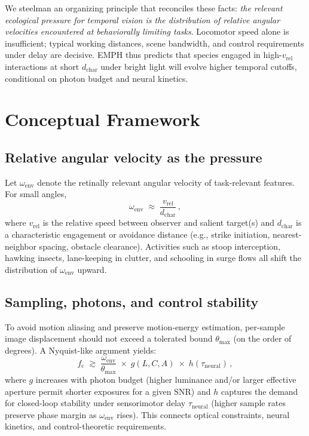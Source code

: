 \documentclass[11pt]{article}
\newcommand{\fc}{f_{\mathrm{c}}}             %
\newcommand{\vrel}{v_{\mathrm{rel}}}          %
\newcommand{\dchar}{d_{\mathrm{char}}}        %
\newcommand{\thetamax}{\theta_{\max}}         %
\newcommand{\taus}{\tau_{\mathrm{neural}}}    %
\newcommand{\Lumin}{L}                        %
\newcommand{\Contrast}{C}                     %
\newcommand{\Aperture}{A}                     %
\begin{document}
We steelman an organizing principle that reconciles these facts: \emph{the relevant ecological pressure for temporal vision is the distribution of relative angular velocities encountered at behaviorally limiting tasks}. Locomotor speed alone is insufficient; typical working distances, scene bandwidth, and control requirements under delay are decisive. EMPH thus predicts that species engaged in high-$\vrel$ interactions at short $\dchar$ under bright light will evolve higher temporal cutoffs, conditional on photon budget and neural kinetics.

\section{Conceptual Framework}
\subsection{Relative angular velocity as the pressure}
Let $\omega_{\text{env}}$ denote the retinally relevant angular velocity of task-relevant features. For small angles,
\begin{equation}
\omega_{\text{env}}\;\approx\;\frac{\vrel}{\dchar}\,,
\end{equation}
where $\vrel$ is the relative speed between observer and salient target(s) and $\dchar$ is a characteristic engagement or avoidance distance (e.g., strike initiation, nearest-neighbor spacing, obstacle clearance). Activities such as stoop interception, hawking insects, lane-keeping in clutter, and schooling in surge flows all shift the distribution of $\omega_{\text{env}}$ upward.

\subsection{Sampling, photons, and control stability}
To avoid motion aliasing and preserve motion-energy estimation, per-sample image displacement should not exceed a tolerated bound $\thetamax$ (on the order of degrees). A Nyquist-like argument yields:
\begin{equation}
\label{eq:nyquist}
\fc \;\gtrsim\; \frac{\omega_{\text{env}}}{\thetamax}\;\times\; g(\Lumin,\Contrast,\Aperture)\;\times\; h(\taus)\,,
\end{equation}
where $g$ increases with photon budget (higher luminance and/or larger effective aperture permit shorter exposures for a given SNR) and $h$ captures the demand for closed-loop stability under sensorimotor delay $\taus$ (higher sample rates preserve phase margin as $\omega_{\text{env}}$ rises). This connects optical constraints, neural kinetics, and control-theoretic requirements.
\end{document}
